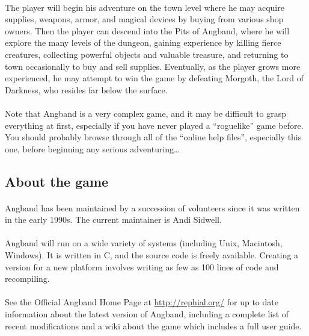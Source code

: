 \paragraph{}The player will begin his adventure on the town level where he may
acquire supplies, weapons, armor, and magical devices by buying from
various shop owners. Then the player can descend into the Pits of
Angband, where he will explore the many levels of the dungeon, gaining
experience by killing fierce creatures, collecting powerful objects and
valuable treasure, and returning to town occasionally to buy and sell
supplies. Eventually, as the player grows more experienced, he may
attempt to win the game by defeating Morgoth, the Lord of Darkness, who
resides far below the surface.

\paragraph{}Note that Angband is a very complex game, and it may be difficult to
grasp everything at first, especially if you have never played a
``roguelike'' game before. You should probably browse through all of the
``online help files'', especially this one, before beginning any serious
adventuring\ldots

\subsection{About the game}
\paragraph{}Angband has been maintained by a succession of volunteers since it was
written in the early 1990s. The current maintainer is Andi Sidwell.

\paragraph{}Angband will run on a wide variety of systems (including Unix,
Macintosh, Windows). It is written in C, and the source code is freely
available. Creating a version for a new platform involves writing as few
as 100 lines of code and recompiling.

\paragraph{}See the Official Angband Home Page at
\url{http://rephial.org/} for up to date information about the latest
version of Angband, including a complete list of recent modifications and
a wiki about the game which includes a full user guide.

